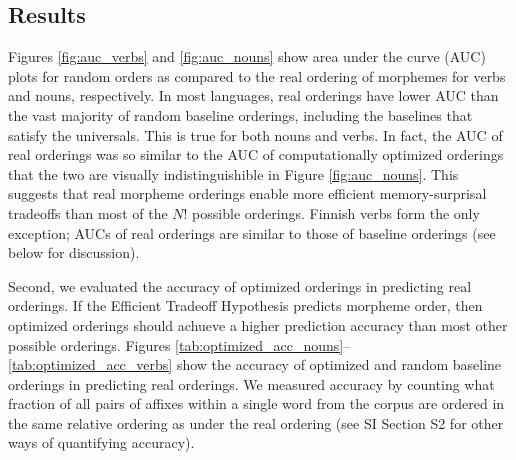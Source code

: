 \documentclass[11pt,letterpaper]{article}
\newcommand{\citet}{\Textcite}
\newcommand\becky[1]{{\color{blue}(#1)}}
\newcounter{def}
\begin{document}



\subsection{Results}

Figures \ref{fig:auc_verbs} and \ref{fig:auc_nouns} show area under the curve (AUC) plots for random orders as compared to the real ordering of morphemes for verbs and nouns, respectively.
In most languages, real orderings have lower AUC than the vast majority of random baseline orderings, including the baselines that satisfy the universals. This is true for both nouns and verbs. In fact, the AUC of real orderings was so similar to the AUC of computationally optimized orderings that the two are visually indistinguishible in Figure  \ref{fig:auc_nouns}. This suggests that real morpheme orderings enable more efficient memory-surprisal tradeoffs than most of the $N!$ possible orderings.
Finnish verbs form the only exception; AUCs of real orderings are similar to those of baseline orderings (see below for discussion).

Second, we evaluated the accuracy of optimized orderings in predicting real orderings.
If the Efficient Tradeoff Hypothesis predicts morpheme order, then optimized orderings should achueve a higher prediction accuracy than most other possible orderings.
Figures \ref{tab:optimized_acc_nouns}--\ref{tab:optimized_acc_verbs} show the accuracy of optimized and random baseline orderings in predicting real orderings. 
We measured accuracy by counting what fraction of all pairs of affixes within a single word from the corpus are ordered in the same relative ordering as under the real ordering (see SI Section S2 for other ways of quantifying accuracy).
\end{document}
